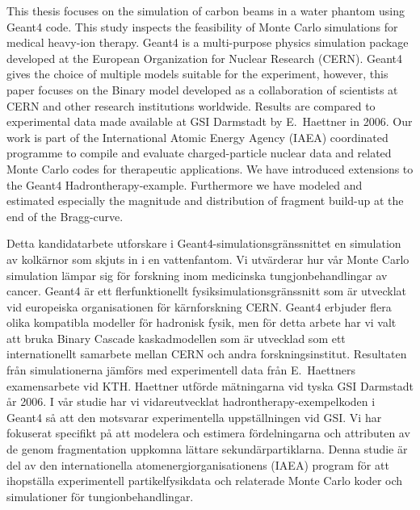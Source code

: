 
\makecoverpage

\begin{abstractpage}[english]
This thesis focuses on the simulation of carbon beams in a water phantom using Geant4 code. This study inspects the feasibility of Monte Carlo simulations for medical heavy-ion therapy. Geant4 is a multi-purpose physics simulation package developed at the European Organization for Nuclear Research (CERN). Geant4 gives the choice of multiple models suitable for the experiment, however, this paper focuses on the Binary model developed as a collaboration of scientists at CERN and other research institutions worldwide. Results are compared to experimental data made available at GSI Darmstadt by E.~Haettner in 2006. Our work is part of the International Atomic Energy Agency (IAEA) coordinated programme to compile and evaluate charged-particle nuclear data and related Monte Carlo codes for therapeutic applications. We have introduced extensions to the Geant4 Hadrontherapy-example. Furthermore we have modeled and estimated especially the magnitude and distribution of fragment build-up at the end of the Bragg-curve.
\end{abstractpage}
\begin{abstractpage}[swedish]
Detta kandidatarbete utforskare i Geant4-simulationsgränssnittet en simulation av kolkärnor som skjuts in i en vattenfantom. Vi utvärderar hur vår Monte Carlo simulation lämpar sig för forskning inom medicinska tungjonbehandlingar av cancer. Geant4 är ett flerfunktionellt fysiksimulationsgränssnitt som är utvecklat vid europeiska organisationen för kärnforskning CERN. Geant4 erbjuder flera olika kompatibla modeller för hadronisk fysik, men för detta arbete har vi valt att bruka Binary Cascade kaskadmodellen som är utvecklad som ett internationellt samarbete mellan CERN och andra forskningsinstitut. Resultaten från simulationerna jämförs med experimentell data från E.~Haettners examensarbete vid KTH. Haettner utförde mätningarna vid tyska GSI Darmstadt år 2006. I vår studie har vi vidareutvecklat hadrontherapy-exempelkoden i Geant4 så att den motsvarar experimentella uppställningen vid GSI. Vi har fokuserat specifikt på att modelera och estimera fördelningarna och attributen av de genom fragmentation uppkomna lättare sekundärpartiklarna. Denna studie är del av den internationella atomenergiorganisationens (IAEA) program för att ihopställa experimentell partikelfysikdata och relaterade Monte Carlo koder och simulationer för tungionbehandlingar.
\end{abstractpage}


